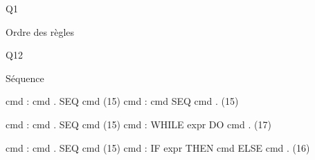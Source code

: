 



Q1

Ordre des règles

Q12

Séquence

	cmd : cmd . SEQ cmd  (15)
	cmd : cmd SEQ cmd .  (15)

        cmd : cmd . SEQ cmd  (15)
	cmd : WHILE expr DO cmd .  (17)

        cmd : cmd . SEQ cmd  (15)
	cmd : IF expr THEN cmd ELSE cmd .  (16)
